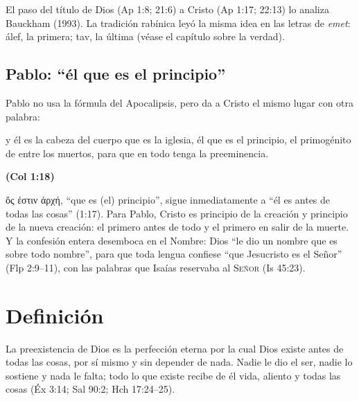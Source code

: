 \documentclass[11pt,letterpaper]{article}
\newcommand{\grc}[1]{\foreignlanguage{ancientgreek}{#1}}
\newcommand{\SENOR}{\textsc{Señor}}
\newcommand{\fuente}[1]{\par\hfill{\upshape\bfseries\small\textcolor{azul}{#1}}}
\begin{document}
\begin{nota}[Precisión]
El paso del título de Dios (Ap 1:8; 21:6) a Cristo (Ap 1:17; 22:13) lo analiza Bauckham (1993). La tradición rabínica leyó la misma idea en las letras de \emph{emet}: álef, la primera; tav, la última (véase el capítulo sobre la verdad).
\end{nota}

\subsection{Pablo: ``él que es el principio''}
Pablo no usa la fórmula del Apocalipsis, pero da a Cristo el mismo lugar con otra palabra:

\begin{cita}y él es la cabeza del cuerpo que es la iglesia, él que es el principio, el primogénito de entre los muertos, para que en todo tenga la preeminencia.\fuente{(Col 1:18)}\end{cita}

\grc{ὅς ἐστιν ἀρχή}, ``que es (el) principio'', sigue inmediatamente a ``él es antes de todas las cosas'' (1:17). Para Pablo, Cristo es principio de la creación y principio de la nueva creación: el primero antes de todo y el primero en salir de la muerte. Y la confesión entera desemboca en el Nombre: Dios ``le dio un nombre que es sobre todo nombre'', para que toda lengua confiese ``que Jesucristo es el Señor'' (Flp 2:9--11), con las palabras que Isaías reservaba al \SENOR{} (Is 45:23).

\section{Definición}

\begin{tcolorbox}[colback=papiro,colframe=azul,boxrule=1pt,arc=3pt,fonttitle=\bfseries,title=Definición]
La preexistencia de Dios es la perfección eterna por la cual Dios existe antes de todas las cosas, por sí mismo y sin depender de nada. Nadie le dio el ser, nadie lo sostiene y nada le falta; todo lo que existe recibe de él vida, aliento y todas las cosas (Éx 3:14; Sal 90:2; Hch 17:24--25).
\end{tcolorbox}
\end{document}
